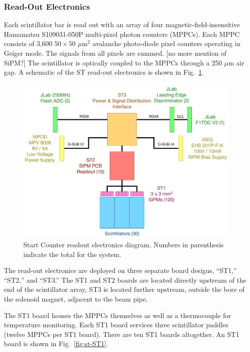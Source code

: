 \subsubsection{Read-Out Electronics}

Each scintillator bar is read out with an array of four
magnetic-field-insensitive Hamamatsu S109031-050P multi-pixel photon
counters (MPPCs). Each MPPC consists of 3,600
$50 \times 50$ $\mu$m$^2$ avalanche photo-diode pixel counters
operating in Geiger mode. The signals from all pixels are summed. [no
  more mention of SiPM?] The scintillator is optically coupled to the
MPPCs through a 250 $\mu$m air gap. A schematic of the ST read-out electronics
is shown in Fig.~\ref{fig:st-electronics}.

\begin{figure}[!htb]
  \centering
  \includegraphics[width=1.0\columnwidth]{figures/st_electronics_diagram}
  \caption{Start Counter readout electronics diagram.  Numbers in 
    parenthesis indicate the total for the system.}
  \label{fig:st-electronics}
\end{figure}

The read-out electronics are deployed on three separate board designs,
``ST1,'' ``ST2,'' and ``ST3.'' The ST1 and ST2 boards are located
directly upstream of the end of the scintillator array, ST3 is located
further upstream, outside the bore of the solenoid magnet, adjacent to
the beam pipe.

The ST1 board houses the MPPCs themselves as well as a thermocouple for
temperature monitoring. Each ST1 board services three scintillator
paddles (twelve MPPCs per ST1 board). There are ten ST1 boards altogether.
An ST1 board is shown in Fig.~\ref{fig:st-ST1}.

